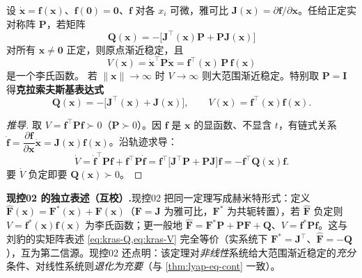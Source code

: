 \begin{theorem}[克拉索夫斯基法]\label{thm:krasovskii}
设 $\dot{\mathbf{x}}=\mathbf{f}(\mathbf{x})$、$\mathbf{f}(\mathbf{0})=\mathbf{0}$、$\mathbf{f}$ 对各 $x_i$ 可微，雅可比 $\mathbf{J}(\mathbf{x})=\partial\mathbf{f}/\partial\mathbf{x}$。任给正定实对称阵 $\mathbf{P}$，若矩阵
\begin{equation}
  \mathbf{Q}(\mathbf{x})=-\big[\mathbf{J}^\top(\mathbf{x})\mathbf{P}+\mathbf{P}\mathbf{J}(\mathbf{x})\big]
  \label{eq:kras-Q}
\end{equation}
对所有 $\mathbf{x}\neq\mathbf{0}$ 正定，则原点渐近稳定，且
\begin{equation}
  V(\mathbf{x})=\dot{\mathbf{x}}^\top\mathbf{P}\dot{\mathbf{x}}=\mathbf{f}^\top(\mathbf{x})\,\mathbf{P}\,\mathbf{f}(\mathbf{x})
  \label{eq:kras-V}
\end{equation}
是一个李氏函数。%
若 $\|\mathbf{x}\|\to\infty$ 时 $V\to\infty$ 则大范围渐近稳定。特别取 $\mathbf{P}=\mathbf{I}$ 得\textbf{克拉索夫斯基表达式}
\begin{equation}
  \mathbf{Q}(\mathbf{x})=-\big[\mathbf{J}^\top(\mathbf{x})+\mathbf{J}(\mathbf{x})\big],\qquad V(\mathbf{x})=\mathbf{f}^\top(\mathbf{x})\mathbf{f}(\mathbf{x}).
  \label{eq:kras-I}
\end{equation}
\end{theorem}

\begin{proof}[推导]
取 $V=\mathbf{f}^\top\mathbf{P}\mathbf{f}\succ0$（$\mathbf{P}\succ0$）。因 $\mathbf{f}$ 是 $\mathbf{x}$ 的显函数、不显含 $t$，有链式关系 $\dot{\mathbf{f}}=\dfrac{\partial\mathbf{f}}{\partial\mathbf{x}}\dot{\mathbf{x}}=\mathbf{J}(\mathbf{x})\mathbf{f}(\mathbf{x})$。沿轨迹求导：
\begin{equation}
  \dot V=\dot{\mathbf{f}}^\top\mathbf{P}\mathbf{f}+\mathbf{f}^\top\mathbf{P}\dot{\mathbf{f}}
  =\mathbf{f}^\top\big[\mathbf{J}^\top\mathbf{P}+\mathbf{P}\mathbf{J}\big]\mathbf{f}=-\mathbf{f}^\top\mathbf{Q}(\mathbf{x})\mathbf{f}.
\end{equation}
要 $\dot V$ 负定即要 $\mathbf{Q}(\mathbf{x})\succ0$。
\end{proof}

\begin{note}
\textbf{现控02 的独立表述（互校）.}\;现控02\cite{zhang2017modern} 把同一定理写成赫米特形式：定义 $\hat{\mathbf{F}}(\mathbf{x})=\mathbf{F}^*(\mathbf{x})+\mathbf{F}(\mathbf{x})$（$\mathbf{F}=\mathbf{J}$ 为雅可比，$\mathbf{F}^*$ 为共轭转置），若 $\hat{\mathbf{F}}$ 负定则 $V=\mathbf{f}^*(\mathbf{x})\mathbf{f}(\mathbf{x})$ 为李氏函数；更一般地 $\hat{\mathbf{F}}=\mathbf{F}^*\mathbf{P}+\mathbf{P}\mathbf{F}+\mathbf{Q}$、$V=\mathbf{f}^*\mathbf{P}\mathbf{f}$。这与刘豹的实矩阵表述 \cref{eq:kras-Q,eq:kras-V} 完全等价（实系统下 $\mathbf{F}^*=\mathbf{J}^\top$、$\hat{\mathbf{F}}=-\mathbf{Q}$），互为第二信源。现控02 还点明：该定理对\emph{非线性}系统给大范围渐近稳定的\emph{充分}条件、对线性系统则\emph{退化为充要}（与 \cref{thm:lyap-eq-cont} 一致）。
\end{note}

